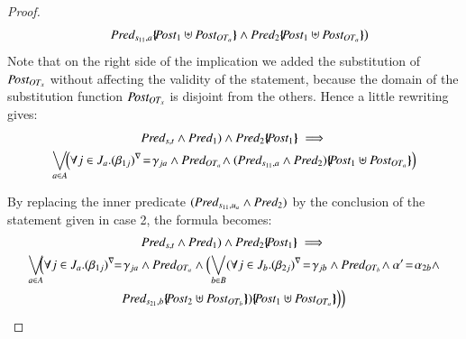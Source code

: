 \documentclass{elsarticle}
\begin{document}
\begin{proof}
\begin{multline*}
     \Pred_{s_{11},a}\subst{\Post_1\uplus\Post_{OT_a}} \wedge \Pred_2\subst{\Post_1\uplus\Post_{OT_a}} \big) \hspace{-2ex}
\end{multline*}
Note that  on the right side of the implication we added  the substitution  of $\Post_{OT_x}$ without affecting the validity of the statement, because  the domain  of the substitution function $\Post_{OT_x}$ is disjoint from the others. Hence a little rewriting gives:
\begin{multline*}
\Pred_{s,t} \land \Pred_1)\wedge\Pred_2\subst{\Post_1}\implies\\
\bigvee_{a\in A}
\!\!   \left(\forall j\in J_a. \vis{\beta_{1j}}\!=\!\gamma_{ja}\land \Pred_{OT_a}
     \!\land(\Pred_{s_{11},a}\wedge\Pred_2)\subst{\Post_1\uplus\Post_{OT_a}} \right)
\end{multline*}

By replacing the inner predicate $(\Pred_{s_{11},u_a}\wedge\Pred_2)$ by the conclusion of the  statement given in case 2,  the formula becomes: 
\begin{multline*}\Pred_{s,t} \land \Pred_1)\wedge\Pred_2\subst{\Post_1}\implies\\
{\bigvee_{a\in A}}
   \!\!\Big(\forall j\in J_a. \vis{\beta_{1j}}\!\!=\!\gamma_{ja}  \land \Pred_{OT_a}
      \land \Big({\bigvee_{b\in B}}(
    \forall j\in J_{b}. \vis{\beta_{2j}}\!=\!\gamma_{jb}  \land \Pred_{OT_{b}}\!\land 
    \alpha'\!=\!\alpha_{2 b} \land\\ \Pred_{s_{21},b}\subst{\Post_2\uplus\Post_{OT_{b}}})\subst{\Post_1\uplus\Post_{OT_a}}\Big)\Big)
\end{multline*}


\end{proof}
\end{document}
